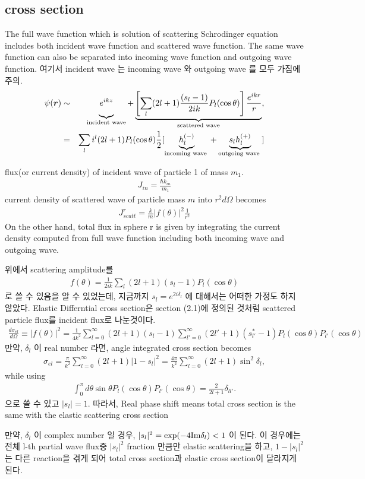 \documentclass[10pt]{article}
\def\bm{\boldsymbol}
\newcommand{\bea}{\begin{eqnarray}}
\newcommand{\eea}{\end{eqnarray}}
\newcommand{\no}{\nonumber \\}
\def\vr{{\bm r}}
\begin{document}
\subsection{cross section}
The full wave function which is solution of scattering Schrodinger equation
includes both incident wave function and scattered wave function. The same wave function 
can also be separated into incoming wave function and outgoing wave function.
여기서 incident wave 는 incoming wave 와 outgoing wave 를 모두 가짐에 주의. 
\bea 
\psi(\vr)&\sim& \underbrace{\vphantom{ \left[\frac{e^{ikr}}{r}\right] }
  e^{ikz} }_{\text{incident wave}}
 +\underbrace{ \left[\sum_l(2l+1)\frac{(s_l-1)}{2ik} P_l(\cos\theta)\right]\frac{e^{ikr}}{r}
 }_{\text{scattered wave}},\no 
 &=&\sum_l i^l (2l+1) P_l(\cos\theta)\frac{1}{2}[
   \underbrace{h_l^{(-)} }_{\text{incoming wave }}
   +\underbrace{ s_l h_l^{(+)} }_{\text{outgoing wave }}] 
\eea  

flux(or current density) of incident wave of particle 1 of mass $m_1$. 
\bea 
J_{in}=\frac{\hbar k_{in}}{m_1}
\eea 
current density of scattered wave of particle mass $m$ into $r^2 d\Omega$ becomes
\bea 
J^r_{scatt}=\frac{k}{m}|f(\theta)|^2 \frac{1}{r^2}
\eea 
On the other hand, total flux in sphere r is given by integrating 
the current density computed from full wave function including both incoming wave and 
outgoing wave.

위에서 scattering amplitude를 
\bea
f(\theta)=\frac{1}{2ik}\sum_l (2l+1)(s_l-1)P_l(\cos\theta)
\eea
로 쓸 수 있음을 알 수 있었는데, 지금까지 $s_l=e^{2i\delta_l}$ 에 
대해서는 어떠한 가정도 하지 않았다. 
Elastic Differntial cross section은 section (2.1)에 정의된
것처럼 scattered particle flux를 incident flux로 나눈것이다.
\bea
\frac{d\sigma_{el}}{d\Omega}\equiv |f(\theta)|^2=
 \frac{1}{4k^2}
 \sum_{l=0}^\infty(2l+1)(s_l-1)
 \sum_{l'=0}^\infty (2l'+1)(s^*_{l'}-1)
 P_{l}(\cos\theta) P_{l'}(\cos\theta)
\eea
만약, $\delta_l$ 이 real number 라면, angle integrated cross section becomes
\bea
\sigma_{el}
=\frac{\pi}{k^2}\sum_{l=0}^\infty(2l+1)|1-s_l|^2
=\frac{4\pi}{k^2}\sum_{l=0}^\infty (2l+1)\sin^2\delta_l
,
\eea 
while using
\bea
\int_0^\pi d\theta\sin\theta 
 P_l(\cos\theta) P_{l'}(\cos\theta)=\frac{2}{2l+1}\delta_{ll'}.
\eea
으로 쓸 수 있고 $|s_l|=1$. 따라서, Real phase shift means
total cross section is the same with the
elastic scattering cross section

만약, $\delta_l$ 이 complex number 일 경우, 
$|s_l|^2=\exp(-4{\rm Im}\delta_l)<1$ 이 된다. 
이 경우에는 전체 l-th partial wave flux중 $|s_l|^2$ fraction
만큼만 elastic scattering을 하고, $1-|s_l|^2$ 는 
다른 reaction을 겪게 되어 
total cross section과 elastic cross section이 달라지게 된다. 
\end{document}
